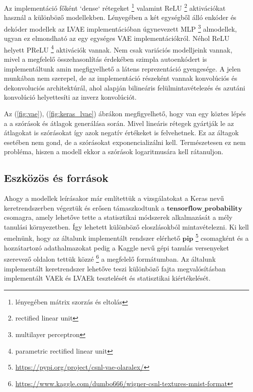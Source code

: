 \documentclass[12pt, english]{article}
\begin{document}
\vspace{4mm}

\par Az implementáció főként `dense` rétegeket \footnote{lényegében mátrix szorzás és eltolás} valamint ReLU \footnote{rectified linear unit} aktivációkat használ a különböző modellekben. Lényegében a két egységből álló enkóder és dekóder modellek az LVAE implementációban úgynevezett MLP \footnote{multilayer perceptron} almodellek, ugyan ez elmondható az egy egységes VAE implementációkról. Néhol ReLU helyett PReLU \footnote{parametric rectified linear unit} aktivációk vannak. Nem csak variációs modelljeink vannak, mivel a megfelelő összehasonlítás érdekében szimpla autoenkódert is implementáltunk amin megfigyelhető a látens reprezentáció gyengesége. A jelen munkában nem szerepel, de az implementáció részeként vannak konvolúciós és dekonvoluciós architektúrál, ahol \cite{odena2016deconvolution} alapján bilineáris felülmintavételezés és azutáni konvolúció helyettesíti az inverz konvolúciót. 

\vspace{4mm}

\par Az (\ref{fig:vae}), (\ref{fig:keras_lvae}) ábrákon megfigyelhető, hogy van egy köztes lépés a a szórások és átlagok generálása során. Mivel lineáris rétegek gyártják le az átlagokat is szórásokat így azok negatív értékeket is felvehetnek. Ez az áltagok esetében nem gond, de a szórásokat exponencializálni kell. Természetesen ez nem probléma, hiszen a modell ekkor a szórások logaritmusára kell rátanuljon.

\vspace{5mm}

\subsection{Eszközös és források}

\vspace{5mm}

\par Ahogy a modellek leírásakor már említettük a vizsgálatokat a Keras nevű keretrendszerben végeztük és erősen támaszkodtunk a $\bm{tensorflow\_probability}$  csomagra, amely lehetőve tette a statisztikai módszerek alkalmazását a mély tanulási környezetben. Így lehetett különböző eloszlásokból mintavételezni. Ki kell emelnünk, hogy az általunk implementált rendszer elérhető $\bm{pip}$ \footnote{\url{https://pypi.org/project/csnl-vae-olaralex/}} csomagként és a hozzátartozó adathalmazokat pedig a Kaggle nevű gépi tanulás versenyeket szerevező oldalon tettük közzé \footnote{\url{https://www.kaggle.com/dumbo666/wigner-csnl-textures-mnist-format}} a megfelelő formátumban. Az általunk implementált keretrendszer lehetőve teszi különböző fajta megvalósításban implementált VAEk és LVAEk tesztelését és statisztikai kiértékelését.
\end{document}
